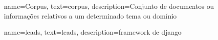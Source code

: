 {
        name=Corpus,
        text=corpus,
        description={Conjunto de documentos ou informações relativos a um determinado tema ou domínio}
}

{
	name=leads,
	text=leads,
	description={framework de django}
}